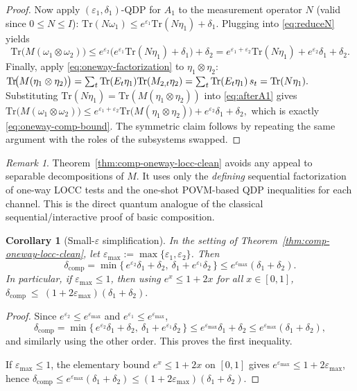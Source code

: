 \documentclass[11pt]{article}
\def\Tr{\mathrm{Tr}}
\theoremstyle{plain}
\newtheorem{corollary}[theo]{Corollary}
\theoremstyle{remark}
\newtheorem{remark}[theo]{Remark}
\begin{document}
\begin{proof}
Now apply $(\varepsilon_1,\delta_1)$-QDP for $A_1$ to the measurement operator $N$ (valid since $0\le N\le I$):
$
\Tr(N\omega_1)\le e^{\varepsilon_1}\Tr(N\eta_1)+\delta_1.
$
Plugging into \eqref{eq:reduceN} yields
\begin{equation}
\label{eq:afterA1}
\Tr\!\big(M(\omega_1\otimes\omega_2)\big)
\le e^{\varepsilon_2}\Big(e^{\varepsilon_1}\Tr(N\eta_1)+\delta_1\Big)+\delta_2
= e^{\varepsilon_1+\varepsilon_2}\Tr(N\eta_1) + e^{\varepsilon_2}\delta_1 + \delta_2.
\end{equation}
Finally, apply \eqref{eq:oneway-factorization} to $\eta_1\otimes\eta_2$:
$ \\
\Tr\!\big(M(\eta_1\otimes\eta_2)\big)
= \sum_t \Tr(E_t\eta_1)\Tr(M_{2,t}\eta_2)
= \sum_t \Tr(E_t\eta_1)\,s_t
= \Tr(N\eta_1).
$
Substituting $\Tr(N\eta_1)=\Tr(M(\eta_1\otimes\eta_2))$ into \eqref{eq:afterA1} gives
$
\Tr\!\big(M(\omega_1\otimes\omega_2)\big)
\le e^{\varepsilon_1+\varepsilon_2}\Tr\!\big(M(\eta_1\otimes\eta_2)\big) + e^{\varepsilon_2}\delta_1 + \delta_2,
$
which is exactly \eqref{eq:oneway-comp-bound}.
The symmetric claim follows by repeating the same argument with the roles of the subsystems swapped.
\end{proof}

\begin{remark}
Theorem~\ref{thm:comp-oneway-locc-clean} avoids any appeal to separable decompositions of $M$.
It uses only the \emph{defining} sequential factorization of one-way LOCC tests and the one-shot
POVM-based QDP inequalities for each channel. This is the direct quantum analogue of the classical
sequential/interactive proof of basic composition.
\end{remark}

\begin{corollary}[Small-$\varepsilon$ simplification]
\label{cor:small-eps-simplification}
In the setting of Theorem~\ref{thm:comp-oneway-locc-clean}, let
$\varepsilon_{\max}:=\max\{\varepsilon_1,\varepsilon_2\}$. Then
\[
\delta_{\mathrm{comp}}
=\min\{\,e^{\varepsilon_2}\delta_1+\delta_2,\ \delta_1+e^{\varepsilon_1}\delta_2\,\}
\le e^{\varepsilon_{\max}}(\delta_1+\delta_2).
\]
In particular, if $\varepsilon_{\max}\le 1$, then using $e^x\le 1+2x$ for all $x\in[0,1]$,
$
\delta_{\mathrm{comp}}\ \le\ (1+2\varepsilon_{\max})(\delta_1+\delta_2).
$
\end{corollary}

\begin{proof}
Since $e^{\varepsilon_2}\le e^{\varepsilon_{\max}}$ and $e^{\varepsilon_1}\le e^{\varepsilon_{\max}}$,
\[
\delta_{\mathrm{comp}}
=\min\{\,e^{\varepsilon_2}\delta_1+\delta_2,\ \delta_1+e^{\varepsilon_1}\delta_2\,\}
\le e^{\varepsilon_{\max}}\delta_1+\delta_2
\le e^{\varepsilon_{\max}}(\delta_1+\delta_2),
\]
and similarly using the other order. This proves the first inequality.

If $\varepsilon_{\max}\le 1$, the elementary bound $e^x\le 1+2x$ on $[0,1]$ gives
$e^{\varepsilon_{\max}}\le 1+2\varepsilon_{\max}$, hence
$\delta_{\mathrm{comp}}\le e^{\varepsilon_{\max}}(\delta_1+\delta_2)
\le (1+2\varepsilon_{\max})(\delta_1+\delta_2).$
\end{proof}
\end{document}
